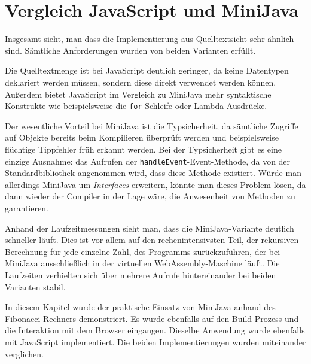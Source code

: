 \section{Vergleich JavaScript und MiniJava}

Insgesamt sieht, man dass die Implementierung aus Quelltextsicht sehr ähnlich sind. Sämtliche Anforderungen wurden von beiden Varianten erfüllt.

Die Quelltextmenge ist bei JavaScript deutlich geringer, da keine Datentypen deklariert werden müssen, sondern diese direkt verwendet werden können. Außerdem bietet JavaScript im Vergleich zu MiniJava mehr syntaktische Konstrukte wie beispielsweise die \lstinline{for}-Schleife oder Lambda-Ausdrücke. 

Der wesentliche Vorteil bei MiniJava ist die Typsicherheit, da sämtliche Zugriffe auf Objekte bereits beim Kompilieren überprüft werden und beispielsweise flüchtige Tippfehler früh erkannt werden. Bei der Typsicherheit gibt es eine einzige Ausnahme: das Aufrufen der \lstinline{handleEvent}-Event-Methode, da von der Standardbibliothek angenommen wird, dass diese Methode existiert. Würde man allerdings MiniJava um \emph{Interfaces} erweitern, könnte man dieses Problem lösen, da dann wieder der Compiler in der Lage wäre, die Anwesenheit von Methoden zu garantieren.

Anhand der Laufzeitmessungen sieht man, dass die MiniJava-Variante deutlich schneller läuft. Dies ist vor allem auf den rechenintensivsten Teil, der rekursiven Berechnung für jede einzelne Zahl, des Programms zurückzuführen, der bei MiniJava ausschließlich in der virtuellen WebAssembly-Maschine läuft. Die Laufzeiten verhielten sich über mehrere Aufrufe hintereinander bei beiden Varianten stabil.

\vspace{4em}
In diesem Kapitel wurde der praktische Einsatz von MiniJava anhand des Fibonacci-Rechners demonstriert. Es wurde ebenfalls auf den Build-Prozess und die Interaktion mit dem Browser eingangen. Dieselbe Anwendung wurde ebenfalls mit JavaScript implementiert. Die beiden Implementierungen wurden miteinander verglichen.
